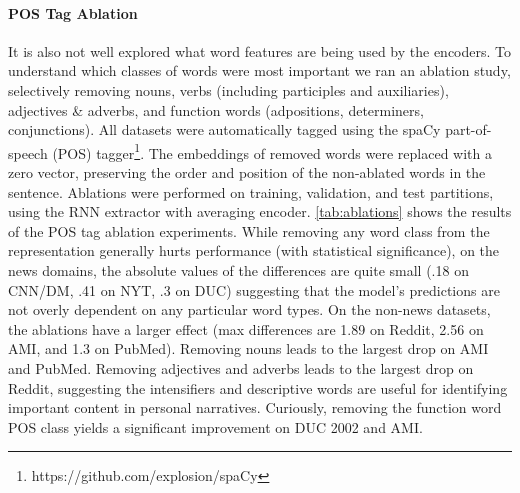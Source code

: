 \paragraph{POS Tag Ablation}
It is also not well explored what word features are being used by the encoders.
To understand which classes of words were most important we ran an ablation
study, selectively removing nouns, verbs 
(including participles and auxiliaries), adjectives \& adverbs, and 
function words (adpositions, determiners, conjunctions).
All datasets were automatically tagged using
the spaCy part-of-speech (POS)
tagger\footnote{https://github.com/explosion/spaCy}.   
The embeddings of removed words were replaced with a zero vector,
preserving the order and position of the non-ablated words in the sentence.
Ablations were performed on training, validation, and test partitions,
using the RNN extractor with averaging encoder.
\autoref{tab:ablations} shows the results of the POS
tag ablation experiments. 
While removing any word class from the representation generally hurts 
performance (with statistical significance), on the news domains,
the absolute values of the differences are quite small 
(.18 on CNN/DM, .41 on NYT, .3 on DUC) suggesting that the model's predictions
are not overly dependent on any particular word types.
On the non-news datasets, the ablations have a larger effect 
(max differences are 1.89 on Reddit, 2.56 on AMI, and 1.3 on PubMed).
Removing nouns leads to the largest drop on AMI and PubMed.
Removing adjectives and adverbs leads to the largest drop on Reddit,
suggesting the intensifiers and descriptive words are useful for 
identifying important content in personal narratives.
Curiously, 
removing the function word POS class yields a significant improvement
on DUC 2002 and AMI.


